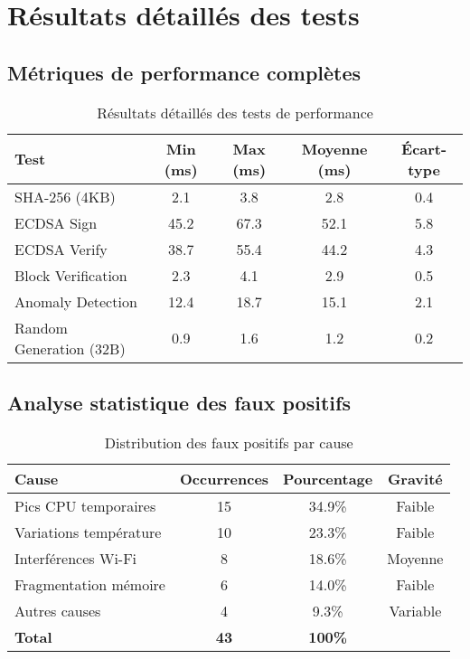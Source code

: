 \section{Résultats détaillés des tests}
\label{app:detailed-results}

\subsection{Métriques de performance complètes}

\begin{table}[h]
\centering
\caption{Résultats détaillés des tests de performance}
\label{tab:detailed-performance}
\begin{tabular}{|l|c|c|c|c|}
\hline
\textbf{Test} & \textbf{Min (ms)} & \textbf{Max (ms)} & \textbf{Moyenne (ms)} & \textbf{Écart-type} \\
\hline
SHA-256 (4KB) & 2.1 & 3.8 & 2.8 & 0.4 \\
ECDSA Sign & 45.2 & 67.3 & 52.1 & 5.8 \\
ECDSA Verify & 38.7 & 55.4 & 44.2 & 4.3 \\
Block Verification & 2.3 & 4.1 & 2.9 & 0.5 \\
Anomaly Detection & 12.4 & 18.7 & 15.1 & 2.1 \\
Random Generation (32B) & 0.9 & 1.6 & 1.2 & 0.2 \\
\hline
\end{tabular}
\end{table}

\subsection{Analyse statistique des faux positifs}

\begin{table}[h]
\centering
\caption{Distribution des faux positifs par cause}
\label{tab:false-positive-analysis}
\begin{tabular}{|l|c|c|c|}
\hline
\textbf{Cause} & \textbf{Occurrences} & \textbf{Pourcentage} & \textbf{Gravité} \\
\hline
Pics CPU temporaires & 15 & 34.9\% & Faible \\
Variations température & 10 & 23.3\% & Faible \\
Interférences Wi-Fi & 8 & 18.6\% & Moyenne \\
Fragmentation mémoire & 6 & 14.0\% & Faible \\
Autres causes & 4 & 9.3\% & Variable \\
\hline
\textbf{Total} & \textbf{43} & \textbf{100\%} & \\
\hline
\end{tabular}
\end{table}


